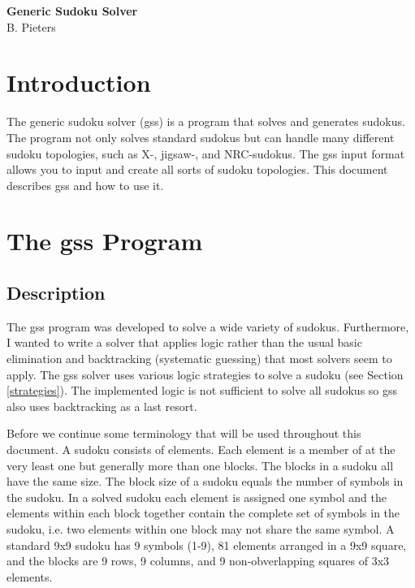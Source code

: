 \documentclass[12pt]{article}
\begin{document}
\begin{titlepage}
\begin{center}
\vspace*{5cm} 
{\Huge\textbf{Generic Sudoku Solver}}\\
\vspace{4cm}
B. Pieters 
\end{center}
\end{titlepage}

\tableofcontents
\pagebreak
\section{Introduction}
The generic sudoku solver (gss) is a program that solves and generates sudokus. The program not only solves standard sudokus but can handle many different sudoku topologies, such as X-, jigsaw-, and NRC-sudokus. The gss input format allows you to input and create all sorts of sudoku topologies. This document describes gss and how to use it.

\section{The gss Program}
\subsection{Description}
The gss program was developed to solve a wide variety of sudokus. Furthermore, I wanted to write a solver that applies logic rather than the usual basic elimination and backtracking (systematic guessing) that most solvers seem to apply. The gss solver uses various logic strategies to solve a sudoku (see Section \ref{strategies}). The implemented logic is not sufficient to solve all sudokus so gss also uses backtracking as a last resort.

Before we continue some terminology that will be used throughout this document. A sudoku consists of elements. Each element is a member of at the very least one but generally more than one blocks. The blocks in a sudoku all have the same size. The block size of a sudoku equals the number of symbols in the sudoku. In a solved sudoku each element is assigned one symbol and the elements within each block together contain the complete set of symbols in the sudoku, i.e. two elements within one block may not share the same symbol. A standard 9x9 sudoku has 9 symbols (1-9), 81 elements arranged in a 9x9 square, and the blocks are 9 rows, 9 columns, and 9 non-obverlapping squares of 3x3 elements.
\end{document}
